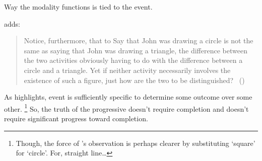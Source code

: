 \begin{note}
  Way the modality functions is tied to the event.

  \citeauthor{Dowty:1979vq} adds:
  \begin{quote}
    Notice, furthermore, that to Say that John was drawing a circle is not the same as saying that John was drawing a triangle, the difference between the two activities obviously having to do with the difference between a circle and a triangle.
    Yet if neither activity necessarily involves the existence of such a figure, just how are the two to be distinguished?%
    \mbox{ }\hfill\mbox{(\citeyear[133]{Dowty:1979vq})}
  \end{quote}

  As \citeauthor{Dowty:1979vq} highlights, event is sufficiently specific to determine some outcome over some other.%
  \footnote{
    Though, the force of \citeauthor{Dowty:1979vq}'s observation is perhaps clearer by substituting `square' for `circle'.
    For, straight line\dots
  }
  So, the truth of the progressive doesn't require completion and doesn't require significant progress toward completion.
\end{note}

